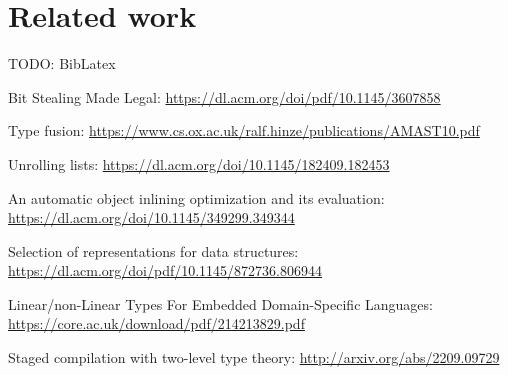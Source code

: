 \section{Related work}\label{sec:related}

TODO: BibLatex

Bit Stealing Made Legal: \url{https://dl.acm.org/doi/pdf/10.1145/3607858}

Type fusion: \url{https://www.cs.ox.ac.uk/ralf.hinze/publications/AMAST10.pdf}

Unrolling lists: \url{https://dl.acm.org/doi/10.1145/182409.182453}

An automatic object inlining optimization and its evaluation:
\url{https://dl.acm.org/doi/10.1145/349299.349344}

Selection of representations for data structures:
\url{https://dl.acm.org/doi/pdf/10.1145/872736.806944}

Linear/non-Linear Types For Embedded Domain-Specific Languages:
\url{https://core.ac.uk/download/pdf/214213829.pdf}

Staged compilation with two-level type theory:
\url{http://arxiv.org/abs/2209.09729}
